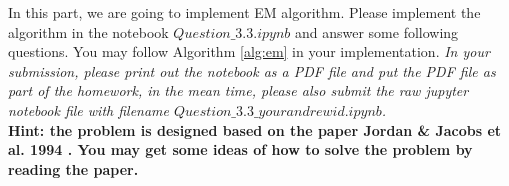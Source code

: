 In this part, we are going to implement EM algorithm. Please implement the algorithm in the notebook $Question\_3.3.ipynb$ and answer some following questions. You may follow Algorithm \ref{alg:em} in your implementation. \emph{In your submission, please print out the notebook as a PDF file and put the PDF file as part of the homework, in the mean time, please also submit the raw jupyter notebook file with filename $Question\_3.3\_yourandrewid.ipynb$.}\\

\noindent
\textbf{Hint: the problem is designed based on the paper Jordan \& Jacobs et al. 1994 \cite{jordan1994hierarchical}. You may get some ideas of how to solve the problem by reading the paper. }






